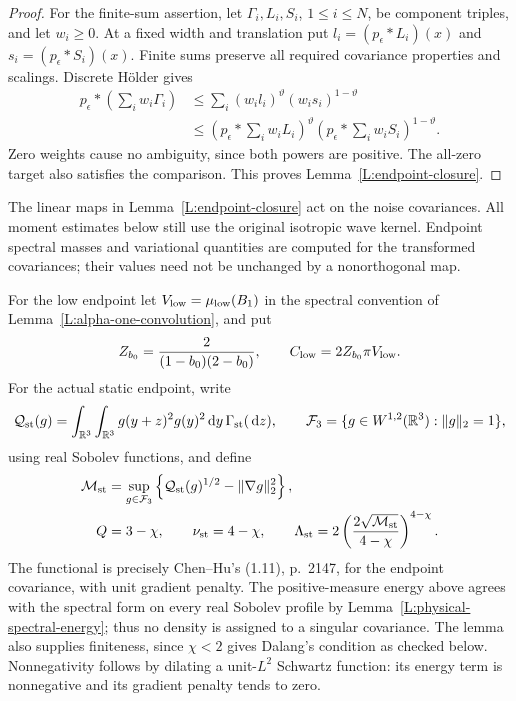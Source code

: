 \documentclass[12pt]{article}
\numberwithin{equation}{section}
\theoremstyle{definition}
\newcommand{\R}{\mathbb{R}}
\newcommand{\ud}{\,\mathrm{d}}
\begin{document}
\begin{proof}
  For the finite-sum assertion, let
  $\Gamma_i,L_i,S_i$, $1\le i\le N$, be component triples, and let
  $w_i\ge0$. At a fixed width and translation put
  $l_i=(p_\epsilon*L_i)(x)$ and $s_i=(p_\epsilon*S_i)(x)$.
  Finite sums preserve all required covariance properties and scalings.
  Discrete H\"older gives
  \[
    \begin{split}
      p_\epsilon*\left(\sum_iw_i\Gamma_i\right)
      &\le\sum_i(w_il_i)^\vartheta(w_is_i)^{1-\vartheta}\\
      &\le\left(p_\epsilon*\sum_iw_iL_i\right)^\vartheta
      \left(p_\epsilon*\sum_iw_iS_i\right)^{1-\vartheta}.
    \end{split}
  \]
  Zero weights cause no ambiguity, since both powers are positive.
  The all-zero target also satisfies the comparison.
  This proves Lemma~\ref{L:endpoint-closure}.
\end{proof}

The linear maps in Lemma~\ref{L:endpoint-closure} act on the noise
covariances. All moment estimates below still use the original isotropic
wave kernel. Endpoint spectral masses and variational quantities are
computed for the transformed covariances; their values need not be
unchanged by a nonorthogonal map.

For the low endpoint let $V_{\rm low}=\mu_{\rm low}(B_1)$ in the
spectral convention of Lemma~\ref{L:alpha-one-convolution}, and put
\[
  Z_{b_0}=\frac2{(1-b_0)(2-b_0)},\qquad
  C_{\rm low}=2Z_{b_0}\pi V_{\rm low}.
\]
For the actual static endpoint, write
\[
  \mathcal{Q}_{\rm st}(g)
  =\int_{\R^3}\int_{\R^3}g(y+z)^2g(y)^2\ud y
  \,\Gamma_{\rm st}(\ud z),\qquad
  \mathcal{F}_3=\{g\in W^{1,2}(\R^3):\|g\|_2=1\},
\]
using real Sobolev functions, and define
\begin{equation}\label{E:three-static-variational}
  \begin{split}
    \mathcal{M}_{\rm st}
    &=\sup_{g\in\mathcal{F}_3}
    \left\{\mathcal{Q}_{\rm st}(g)^{1/2}-\|\nabla g\|_2^2\right\},\\
    Q&=3-\chi,\qquad \nu_{\rm st}=4-\chi,\qquad
    \Lambda_{\rm st}
    =2\left(\frac{2\sqrt{\mathcal{M}_{\rm st}}}{4-\chi}\right)^{4-\chi}.
  \end{split}
\end{equation}
The functional is precisely Chen--Hu's (1.11), p.~2147, for the endpoint
covariance, with unit gradient penalty. The positive-measure energy above
agrees with the spectral form on every real Sobolev profile by
Lemma~\ref{L:physical-spectral-energy}; thus no density is assigned to a
singular covariance. The lemma also supplies finiteness, since $\chi<2$
gives Dalang's condition as checked below.
Nonnegativity follows by dilating a unit-$L^2$ Schwartz function: its
energy term is nonnegative and its gradient penalty tends to zero.
\end{document}
